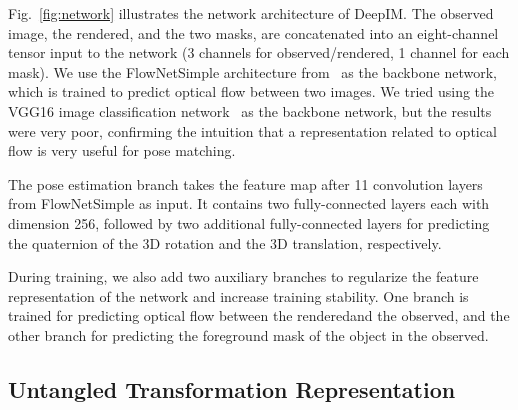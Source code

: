 \documentclass[twocolumn]{svjour3}
\newcommand{\dimnet}[0]{DeepIM}
\newcommand{\rend}[0]{rendered}
\newcommand{\real}[0]{observed}
\begin{document}
Fig.~\ref{fig:network} illustrates the network architecture of \dimnet. 
The observed image, the \rend\image, and the two masks, are concatenated into an eight-channel tensor input to the network (3 channels for \real/\rend\image, 1 channel for each mask). 
We use the FlowNetSimple architecture from~\cite{dosovitskiy2015flownet} as the backbone network, which is trained to predict optical flow between two images.
We tried using the VGG16 image classification network~\citep{simonyan2014very} as the backbone network, but the results were very poor, confirming the intuition that a representation related to optical flow is very useful for pose matching.

The pose estimation branch takes the feature map after 11 convolution layers from FlowNetSimple as input. It contains two fully-connected layers each with dimension 256, followed by two additional fully-connected layers for predicting the quaternion of the 3D rotation and the 3D translation, respectively. 

During training, we also add two auxiliary branches to regularize the feature representation of the network and increase training stability. One branch is trained for predicting optical flow between the \rend\image and the \real\image, and the other branch for predicting the foreground mask of the object in the \real\image. 


\subsection{Untangled Transformation Representation}
\label{sec:untangle}
\end{document}
